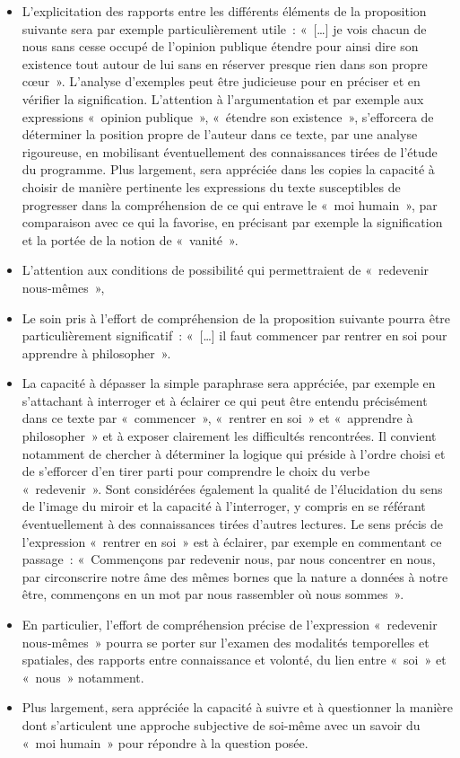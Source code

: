 {\begin{itemize}
\item L'explicitation des rapports entre les différents éléments de la proposition suivante
sera par exemple particulièrement utile~: «~[…] je vois chacun de nous sans cesse
occupé de l'opinion publique étendre pour ainsi dire son existence tout autour de lui
sans en réserver presque rien dans son propre cœur~». L'analyse d'exemples peut
être judicieuse pour en préciser et en vérifier la signification. L'attention à
l'argumentation et par exemple aux expressions «~opinion publique~», «~étendre son
existence~», s'efforcera de déterminer la position propre de l'auteur dans ce texte, par
une analyse rigoureuse, en mobilisant éventuellement des connaissances tirées de
l'étude du programme. Plus largement, sera appréciée dans les copies la capacité à
choisir de manière pertinente les expressions du texte susceptibles de progresser dans la compréhension de ce qui entrave le «~moi humain~», par comparaison avec ce
qui la favorise, en précisant par exemple la signification et la portée de la notion de
«~vanité~».
\item L'attention aux conditions de possibilité qui permettraient de «~redevenir nous-mêmes~»,
\item Le soin pris à l'effort de compréhension de la proposition suivante pourra être
particulièrement significatif~: «~[…] il faut commencer par rentrer en soi pour apprendre
à philosopher~».
\item La capacité à dépasser la simple paraphrase sera appréciée, par exemple en
s'attachant à interroger et à éclairer ce qui peut être entendu précisément dans ce
texte par «~commencer~», «~rentrer en soi~» et «~apprendre à philosopher~» et à
exposer clairement les difficultés rencontrées. Il convient notamment de chercher à
déterminer la logique qui préside à l'ordre choisi et de s'efforcer d'en tirer parti pour
comprendre le choix du verbe «~redevenir~». Sont considérées également la qualité de
l'élucidation du sens de l'image du miroir et la capacité à l'interroger, y compris en se
référant éventuellement à des connaissances tirées d'autres lectures. Le sens précis
de l'expression «~rentrer en soi~» est à éclairer, par exemple en commentant ce
passage~: «~Commençons par redevenir nous, par nous concentrer en nous, par
circonscrire notre âme des mêmes bornes que la nature a données à notre être,
commençons en un mot par nous rassembler où nous sommes~».
\item En particulier, l'effort de compréhension précise de l'expression «~redevenir
nous-mêmes~» pourra se porter sur l'examen des modalités temporelles et spatiales,
des rapports entre connaissance et volonté, du lien entre «~soi~» et «~nous~»
notamment.
\item Plus largement, sera appréciée la capacité à suivre et à questionner la manière
dont s'articulent une approche subjective de soi-même avec un savoir du «~moi
humain~» pour répondre à la question posée.
\end{itemize}}%
